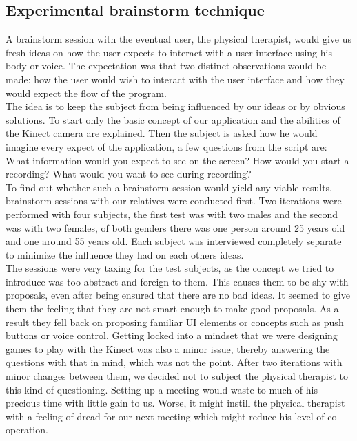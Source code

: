 \subsection{Experimental brainstorm technique}

A brainstorm session with the eventual user, the physical therapist, would give us fresh ideas on how the user expects to interact with a user interface using his body or voice. The expectation was that two distinct observations would be made: how the user would wish to interact with the user interface and how they would expect the flow of the program.\\


The idea is to keep the subject from being influenced by our ideas or by obvious solutions. To start only the basic concept of our application and the abilities of the Kinect camera are explained. Then the subject is asked how he would imagine every expect of the application, a few questions from the script are: What information would you expect to see on the screen? How would you start a recording? What would you want to see during recording?\\

To find out whether such a brainstorm session would yield any viable results, brainstorm sessions with our relatives were conducted first. Two iterations were performed with four subjects, the first test was with two males and the second was with two females, of both genders there was one person around 25 years old and one around 55 years old. Each subject was interviewed completely separate to minimize the influence they had on each others ideas.\\

The sessions were very taxing for the test subjects, as the concept we tried to introduce was too abstract and foreign to them. This causes them to be shy with proposals, even after being ensured that there are no bad ideas. It seemed to give them the feeling that they are not smart enough to make good proposals. As a result they fell back on proposing  familiar UI elements or concepts such as push buttons or voice control. Getting locked into a mindset that we were designing games to play with the Kinect was also a minor issue, thereby answering the questions with that in mind, which was not the point. After two iterations with minor changes between them, we decided not to subject the physical therapist to this kind of questioning. Setting up a meeting would waste to much of his precious time with little gain to us. Worse, it might instill the physical therapist with a feeling of dread for our next meeting which might reduce his level of co-operation.\\

